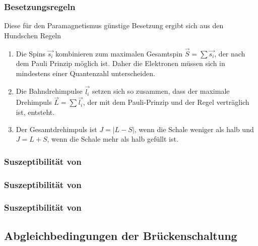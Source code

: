 \subsubsection{Besetzungsregeln}
Diese für den Paramagnetismus günstige Besetzung ergibt sich aus den Hundschen Regeln
\begin{enumerate}
    \item{ Die Spins $\vec{s_i}$ kombinieren zum maximalen Gesamtspin $\vec{S}=\sum\vec{s_i}$, der nach dem Pauli
    Prinzip möglich ist. Daher die Elektronen müssen sich in mindestens einer Quantenzahl unterscheiden.}
    \item Die Bahndrehimpulse $\vec{l_i}$ setzen sich so zusammen, dass der maximale Drehimpuls 
    $\vec{L}=\sum\vec{l_i}$, der mit dem Pauli-Prinzip und der Regel verträglich ist, entsteht.
    \item Der Gesamtdrehimpuls ist $J= \left|L-S\right|$, wenn die Schale weniger als halb und 
    $J=L+S$, wenn die Schale mehr als halb gefüllt ist.
    \label{Hundsche_Regel}
\end{enumerate}

\subsubsection{Suszeptibilität von }
\subsubsection{Suszeptibilität von }
\subsubsection{Suszeptibilität von }
\subsection{Abgleichbedingungen der Brückenschaltung}
\cite{sample}
